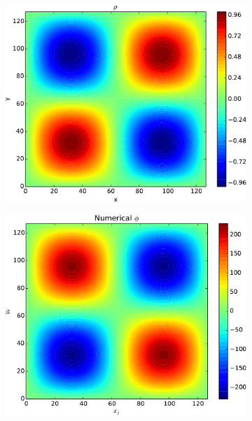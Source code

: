 	\begin{figure}
		\centering
			\begin{subfigure}[b]{0.32\textwidth}
				\includegraphics[width = \textwidth]{figures/verification/analytical/sinusoidal/rho.pdf}
			\end{subfigure}
			\begin{subfigure}[b]{0.32\textwidth}
				\includegraphics[width = \textwidth]{figures/verification/analytical/sinusoidal/numerical.pdf}
			\end{subfigure}
			\begin{subfigure}[b]{0.32\textwidth}

\end{subfigure}
\end{figure}
